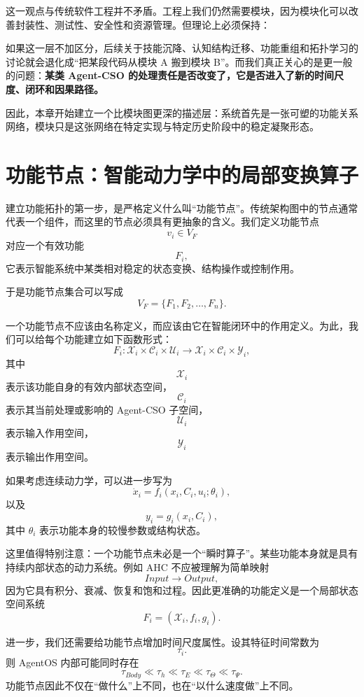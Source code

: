 这一观点与传统软件工程并不矛盾。工程上我们仍然需要模块，因为模块化可以改善封装性、测试性、安全性和资源管理。但理论上必须保持：
\begin{statementbox}
\centering
{}
\end{statementbox}

如果这一层不加区分，后续关于技能沉降、认知结构迁移、功能重组和拓扑学习的讨论就会退化成“把某段代码从模块 A 搬到模块 B”。而我们真正关心的是更一般的问题：\textbf{某类 Agent-CSO 的处理责任是否改变了，它是否进入了新的时间尺度、闭环和因果路径。}

因此，本章开始建立一个比模块图更深的描述层：系统首先是一张可塑的功能关系网络，模块只是这张网络在特定实现与特定历史阶段中的稳定凝聚形态。


\section{功能节点：智能动力学中的局部变换算子}

建立功能拓扑的第一步，是严格定义什么叫“功能节点”。传统架构图中的节点通常代表一个组件，而这里的节点必须具有更抽象的含义。我们定义功能节点
\[
v_i\in V_F
\]
对应一个有效功能
\[
F_i,
\]
它表示智能系统中某类相对稳定的状态变换、结构操作或控制作用。

于是功能节点集合可以写成
\[
V_F
=
\{F_1,F_2,\ldots,F_n\}.
\]

一个功能节点不应该由名称定义，而应该由它在智能闭环中的作用定义。为此，我们可以给每个功能建立如下函数形式：
\[
F_i:
\mathcal X_i
\times
\mathcal C_i
\times
\mathcal U_i
\rightarrow
\mathcal X_i
\times
\mathcal C_i
\times
\mathcal Y_i,
\]
其中
\[
\mathcal X_i
\]
表示该功能自身的有效内部状态空间，
\[
\mathcal C_i
\]
表示其当前处理或影响的 Agent-CSO 子空间，
\[
\mathcal U_i
\]
表示输入作用空间，
\[
\mathcal Y_i
\]
表示输出作用空间。

如果考虑连续动力学，可以进一步写为
\[
\dot{x}_i
=
f_i
\left(
x_i,
C_i,
u_i;
\theta_i
\right),
\]
以及
\[
y_i
=
g_i
\left(
x_i,
C_i
\right),
\]
其中 $\theta_i$ 表示功能本身的较慢参数或结构状态。

这里值得特别注意：一个功能节点未必是一个“瞬时算子”。某些功能本身就是具有持续内部状态的动力系统。例如 AHC 不应被理解为简单映射
\[
Input\rightarrow Output,
\]
因为它具有积分、衰减、恢复和饱和过程。因此更准确的功能定义是一个局部状态空间系统
\[
F_i
=
(\mathcal X_i,f_i,g_i).
\]

进一步，我们还需要给功能节点增加时间尺度属性。设其特征时间常数为
\[
\tau_i.
\]
则 AgentOS 内部可能同时存在
\[
\tau_{Body}
\ll
\tau_h
\ll
\tau_E
\ll
\tau_\Theta
\ll
\tau_\Psi.
\]
功能节点因此不仅在“做什么”上不同，也在“以什么速度做”上不同。

